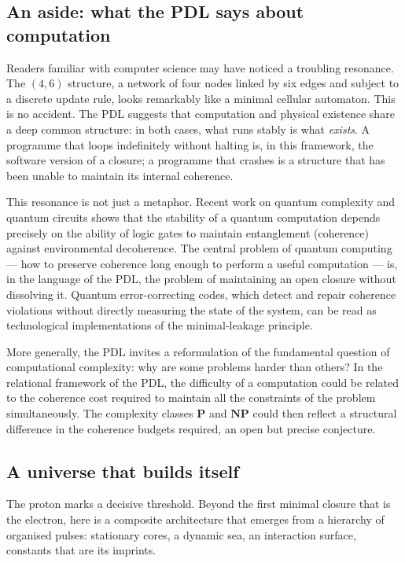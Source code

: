 \documentclass[11pt, a4paper, openright]{book}
\begin{document}
\subsection*{An aside: what the PDL says about computation}

Readers familiar with computer science may have noticed a troubling resonance. The $(4,6)$ structure, a network of four nodes linked by six edges and subject to a discrete update rule, looks remarkably like a minimal cellular automaton. This is no accident. The PDL suggests that computation and physical existence share a deep common structure: in both cases, what runs stably is what \emph{exists}. A programme that loops indefinitely without halting is, in this framework, the software version of a closure; a programme that crashes is a structure that has been unable to maintain its internal coherence.

\medskip

This resonance is not just a metaphor. Recent work on quantum complexity and quantum circuits shows that the stability of a quantum computation depends precisely on the ability of logic gates to maintain entanglement (coherence) against environmental decoherence. The central problem of quantum computing — how to preserve coherence long enough to perform a useful computation — is, in the language of the PDL, the problem of maintaining an open closure without dissolving it. Quantum error-correcting codes, which detect and repair coherence violations without directly measuring the state of the system, can be read as technological implementations of the minimal-leakage principle.

\medskip

More generally, the PDL invites a reformulation of the fundamental question of computational complexity: why are some problems harder than others? In the relational framework of the PDL, the difficulty of a computation could be related to the coherence cost required to maintain all the constraints of the problem simultaneously. The complexity classes $\mathbf{P}$ and $\mathbf{NP}$ could then reflect a structural difference in the coherence budgets required, an open but precise conjecture.

\subsection*{A universe that builds itself}

The proton marks a decisive threshold. Beyond the first minimal closure that is the electron, here is a composite architecture that emerges from a hierarchy of organised pulses: stationary cores, a dynamic sea, an interaction surface, constants that are its imprints.
\end{document}
